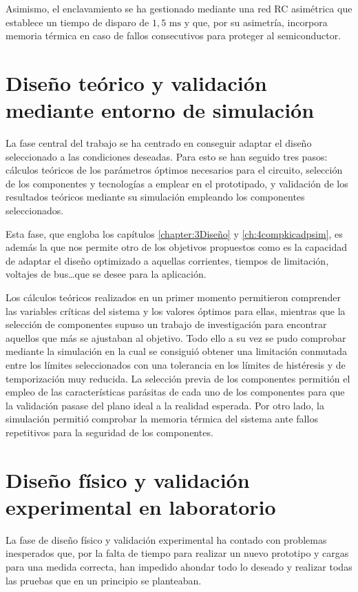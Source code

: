\documentclass[12pt]{report} %
\begin{document}
Asimismo, el enclavamiento se ha gestionado mediante una red RC asimétrica que establece un tiempo de disparo de $1{,}5\text{ ms}$ y que, por su asimetría, incorpora memoria térmica en caso de fallos consecutivos para proteger al semiconductor. 

\section{Diseño teórico y validación mediante entorno de simulación}
La fase central del trabajo se ha centrado en conseguir adaptar el diseño seleccionado a las condiciones deseadas. Para esto se han seguido tres pasos: cálculos teóricos de los parámetros óptimos necesarios para el circuito, selección de los componentes y tecnologías a emplear en el prototipado, y validación de los resultados teóricos mediante su simulación empleando los componentes seleccionados. 

Esta fase, que engloba los capítulos \ref{chapter:3Diseño} y \ref{ch:4compkicadpsim}, es además la que nos permite otro de los objetivos propuestos como es la capacidad de adaptar el diseño optimizado a aquellas corrientes, tiempos de limitación, voltajes de bus\dots que se desee para la aplicación.

Los cálculos teóricos realizados en un primer momento permitieron comprender las variables críticas del sistema y los valores óptimos para ellas, mientras que la selección de componentes supuso un trabajo de investigación para encontrar aquellos que más se ajustaban al objetivo. Todo ello a su vez se pudo comprobar mediante la simulación en la cual se consiguió obtener una limitación conmutada entre los límites seleccionados con una tolerancia en los límites de histéresis y de temporización muy reducida. La selección previa de los componentes permitión el empleo de las características parásitas de cada uno de los componentes para que la validación pasase del plano ideal a la realidad esperada. Por otro lado, la simulación permitió comprobar la memoria térmica del sistema ante fallos repetitivos para la seguridad de los componentes. 

\section{Diseño físico y validación experimental en laboratorio}
\label{sec:validacion_experimental}
La fase de diseño físico y validación experimental ha contado con problemas inesperados que, por la falta de tiempo para realizar un nuevo prototipo y cargas para una medida correcta, han impedido ahondar todo lo deseado y realizar todas las pruebas que en un principio se planteaban. 
\end{document}
